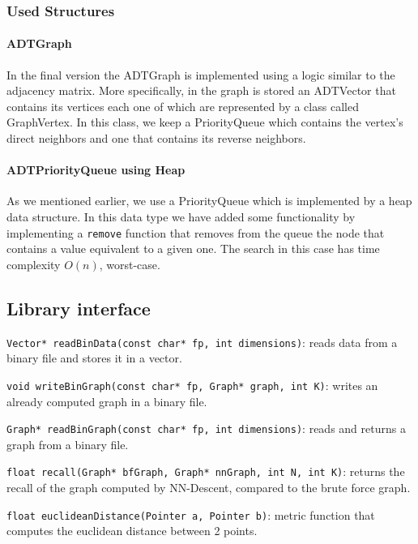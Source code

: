 \documentclass[
  10,
  letterpaperpaper,
  twocolumn]{article}
\begin{document}
\subsubsection{Used Structures}\label{used-structures}

\paragraph{ADTGraph}\label{adtgraph}

In the final version the ADTGraph is implemented using a logic similar
to the adjacency matrix. More specifically, in the graph is stored an
ADTVector that contains its vertices each one of which are represented
by a class called GraphVertex. In this class, we keep a PriorityQueue
which contains the vertex's direct neighbors and one that contains its
reverse neighbors.

\paragraph{ADTPriorityQueue using
Heap}\label{adtpriorityqueue-using-heap}

As we mentioned earlier, we use a PriorityQueue which is implemented by
a heap data structure. In this data type we have added some
functionality by implementing a \texttt{remove} function
that removes from the queue the node that contains a value equivalent to
a given one. The search in this case has time complexity \(O(n)\),
worst-case.

\subsection{Library interface}\label{library-interface}

\texttt{Vector* readBinData(const char* fp, int dimensions)}:
reads data from a binary file and stores it in a vector.

\texttt{void writeBinGraph(const char* fp, Graph* graph, int K)}:
writes an already computed graph in a binary file.

\texttt{Graph* readBinGraph(const char* fp, int dimensions)}:
reads and returns a graph from a binary file.

\texttt{float recall(Graph* bfGraph, Graph* nnGraph, int N, int K)}:
returns the recall of the graph computed by NN-Descent, compared to the
brute force graph.

\texttt{float euclideanDistance(Pointer a, Pointer b)}:
metric function that computes the euclidean distance between 2 points.
\end{document}
